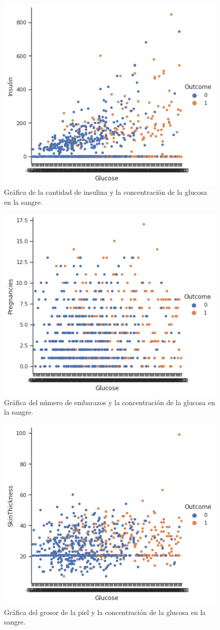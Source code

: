 \documentclass{article}
\begin{document}
\begin{figure}[H]
	\centering
	\includegraphics[width=0.65\linewidth]{Insulin_Glucose.png}
	\caption{Gráfica de la cantidad de insulina y la concentración de la glucosa en la sangre.}%
	\label{fig:Insulin_Glucose}
\end{figure}

\begin{figure}[H]
	\centering
	\includegraphics[width=0.65\linewidth]{Pregnancies_Glucose.png}
	\caption{Gráfica del número de embarazos y la concentración de la glucosa en la sangre.}%
	\label{fig:Pregnancies_Glucose}
\end{figure}

\begin{figure}[H]
	\centering
	\includegraphics[width=0.65\linewidth]{SkinThickness_Glucose.png}
	\caption{Gráfica del grosor de la piel y la concentración de la glucosa en la sangre.}%
	\label{fig:SkinThickness_Glucose}
\end{figure}
\end{document}
